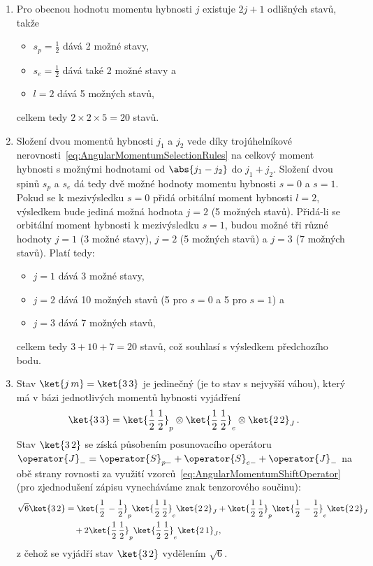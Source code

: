 \begin{solution}
	\begin{enumerate}
	\item
		Pro obecnou hodnotu momentu hybnosti $j$ existuje $2j+1$ odlišných stavů, takže
		\begin{itemize}
		\item
			$s_{p}=\frac{1}{2}$ dává 2 možné stavy,
			
		\item
			$s_{e}=\frac{1}{2}$ dává také 2 možné stavy a
			
		\item 
			$l=2$ dává 5 možných stavů,
		\end{itemize}
		celkem tedy $2\times2\times5=20$ stavů.
		
	\item
		Složení dvou momentů hybnosti $j_{1}$ a $j_{2}$ vede díky trojúhelníkové nerovnosti~\eqref{eq:AngularMomentumSelectionRules} na celkový moment hybnosti s možnými hodnotami od $\abs{j_{1}-j_{2}}$ do $j_{1}+j_{2}$.
		Složení dvou spinů $s_{p}$ a $s_{e}$ dá tedy dvě možné hodnoty momentu hybnosti $s=0$ a $s=1$.
		Pokud se k mezivýsledku $s=0$ přidá orbitální moment hybnosti $l=2$, výsledkem bude jediná možná hodnota $j=2$ (5 možných stavů).
		Přidá-li se orbitální moment hybnosti k mezivýsledku $s=1$, budou možné tři různé hodnoty $j=1$ (3 možné stavy), $j=2$ (5 možných stavů) a $j=3$ (7 možných stavů).
		Platí tedy:
		\begin{itemize}
		\item
			$j=1$ dává 3 možné stavy,
		\item
			$j=2$ dává 10 možných stavů (5 pro $s=0$ a 5 pro $s=1$) a
		\item
			$j=3$ dává 7 možných stavů,
		\end{itemize}
		celkem tedy $3+10+7=20$ stavů, což souhlasí s výsledkem předchozího bodu.
		
	\item
		Stav $\ket{j\,m}=\ket{3\,3}$ je jedinečný (je to stav s nejvyšší váhou), který má v bázi jednotlivých momentů hybnosti vyjádření
		\begin{equation}
			\ket{3\,3}=\ket{\frac{1}{2}\,\frac{1}{2}}_{p}\otimes\ket{\frac{1}{2}\,\frac{1}{2}}_{e}\otimes\ket{2\,2}_{J}\,.
		\end{equation}
		Stav $\ket{3\,2}$ se získá působením posunovacího operátoru $\operator{J}_{-}=\operator{S}_{p-}+\operator{S}_{e-}+\operator{J}_{-}$ na obě strany rovnosti za využití vzorců~\eqref{eq:AngularMomentumShiftOperator} (pro zjednodušení zápisu vynecháváme znak tenzorového součinu):
		\begin{align}
			\sqrt{6}\ket{3\,2}
				&=\ket{\frac{1}{2}\,-\frac{1}{2}}_{p}\ket{\frac{1}{2}\,\frac{1}{2}}_{e}\ket{2\,2}_{J}
					+\ket{\frac{1}{2}\,\frac{1}{2}}_{p}\ket{\frac{1}{2}\,-\frac{1}{2}}_{e}\ket{2\,2}_{J}\nonumber\\
				&\quad+2\ket{\frac{1}{2}\,\frac{1}{2}}_{p}\ket{\frac{1}{2}\,\frac{1}{2}}_{e}\ket{2\,1}_{J},
		\end{align}
		z čehož se vyjádří stav $\ket{3\,2}$ vydělením $\sqrt{6}$.
				

\end{enumerate}
\end{solution}
